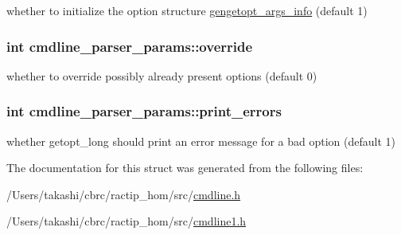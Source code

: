 whether to initialize the option structure \hyperlink{structgengetopt__args__info}{gengetopt\+\_\+args\+\_\+info} (default 1) 

\hypertarget{structcmdline__parser__params_ad3ff9d69146e69a47506782197b5675c}{
\subsubsection[{override}]{\setlength{\rightskip}{0pt plus 5cm}int cmdline\+\_\+parser\+\_\+params\+::override}}\label{structcmdline__parser__params_ad3ff9d69146e69a47506782197b5675c}


whether to override possibly already present options (default 0) 

\hypertarget{structcmdline__parser__params_a3236f066777488e8502abe05ccd24455}{
\subsubsection[{print\+\_\+errors}]{\setlength{\rightskip}{0pt plus 5cm}int cmdline\+\_\+parser\+\_\+params\+::print\+\_\+errors}}\label{structcmdline__parser__params_a3236f066777488e8502abe05ccd24455}


whether getopt\+\_\+long should print an error message for a bad option (default 1) 



The documentation for this struct was generated from the following files\+:\begin{DoxyCompactItemize}
\item 
/\+Users/takashi/cbrc/ractip\+\_\+hom/src/\hyperlink{cmdline_8h}{cmdline.\+h}\item 
/\+Users/takashi/cbrc/ractip\+\_\+hom/src/\hyperlink{cmdline1_8h}{cmdline1.\+h}\end{DoxyCompactItemize}
